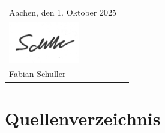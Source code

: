 \documentclass{article}
\theoremstyle{mystyle}
\begin{document}
\noindent

\thispagestyle{empty}

\begin{tabularx}{\textwidth}{@{}lX@{}}
Aachen, den 1. Oktober 2025 
& 
\begin{flushright}

  \rule{6cm}{0.4pt} \\[-1.5cm] %
  \includegraphics[height=1.8cm]{images/unterschrift.png} \\
  Fabian Schuller
\end{flushright}

\end{tabularx}

\newpage

\tableofcontents
\newpage

















\section{Quellenverzeichnis}

\printbibliography
\end{document}
